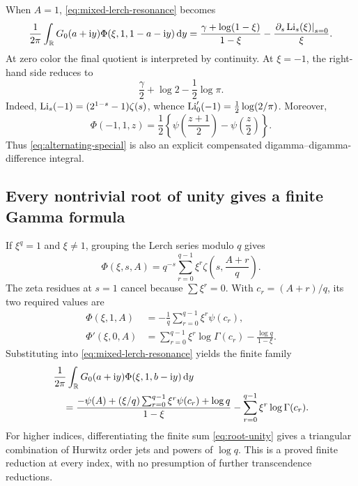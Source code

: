 When $A=1$, \eqref{eq:mixed-lerch-resonance} becomes
\begin{equation}\label{eq:mixed-Li0}
 \frac1{2\pi}\int_{\mathbb R}G_0(a+\mathrm i y)\Phi(\xi,1,1-a-\mathrm i y)\,\mathrm d y
 =\frac{\gamma+\log(1-\xi)}{1-\xi}
       -\frac{\left.\partial_s\operatorname{Li}_s(\xi)\right|_{s=0}}{\xi}.
\end{equation}
At zero color the final quotient is interpreted by continuity. At
$\xi=-1$, the right-hand side reduces to
\begin{equation}\label{eq:alternating-special}
 \frac\gamma2+\log2-\frac12\log\pi.
\end{equation}
Indeed, $\operatorname{Li}_s(-1)=(2^{1-s}-1)\zeta(s)$, whence
$\operatorname{Li}'_0(-1)=\frac12\log(2/\pi)$. Moreover,
\[
 \Phi(-1,1,z)=\frac12\left\{\psi\left(\frac{z+1}{2}\right)
                           -\psi\left(\frac z2\right)\right\}.
\]
Thus \eqref{eq:alternating-special} is also an explicit compensated
digamma--digamma-difference integral.

\subsection{Every nontrivial root of unity gives a finite Gamma formula}
If $\xi^q=1$ and $\xi\ne1$, grouping the Lerch series modulo $q$ gives
\begin{equation}\label{eq:root-unity}
 \Phi(\xi,s,A)=q^{-s}\sum_{r=0}^{q-1}\xi^r
                                \zeta\left(s,\frac{A+r}{q}\right).
\end{equation}
The zeta residues at $s=1$ cancel because $\sum\xi^r=0$. With
$c_r=(A+r)/q$, its two required values are
\begin{align}
 \Phi(\xi,1,A)&=-\frac1q\sum_{r=0}^{q-1}\xi^r\psi(c_r),\label{eq:root-one}\\
 \Phi'(\xi,0,A)&=\sum_{r=0}^{q-1}\xi^r\log\Gamma(c_r)
                                      -\frac{\log q}{1-\xi}.
                                          \label{eq:root-zero-derivative}
\end{align}
Substituting into \eqref{eq:mixed-lerch-resonance} yields the finite family
\begin{align}
 &\frac1{2\pi}\int_{\mathbb R}G_0(a+\mathrm i y)\Phi(\xi,1,b-\mathrm i y)\,\mathrm d y\notag\\
 &\quad=\frac{-\psi(A)+(\xi/q)\sum_{r=0}^{q-1}\xi^r\psi(c_r)
                      +\log q}{1-\xi}
             -\sum_{r=0}^{q-1}\xi^r\log\Gamma(c_r).
                 \label{eq:root-Gamma-pair}
\end{align}
For higher indices, differentiating the finite sum
\eqref{eq:root-unity} gives a triangular combination of Hurwitz order
jets and powers of $\log q$. This is a proved finite reduction at every
index, with no presumption of further transcendence reductions.
